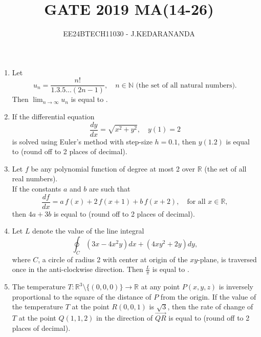 \documentclass[journal]{IEEEtran}
\renewcommand{\thefigure}{\theenumi}
\renewcommand{\thetable}{\theenumi}
\numberwithin{equation}{enumi}
\numberwithin{figure}{enumi}
\renewcommand{\thetable}{\theenumi}
\begin{document}

\vspace{3cm}

\title{GATE 2019 MA(14-26)}
\author{EE24BTECH11030 - J.KEDARANANDA}
{\let\newpage\relax\maketitle}
\renewcommand{\thefigure}{\theenumi}
\renewcommand{\thetable}{\theenumi}
\begin{enumerate}
\item  Let
\[
u_n = \frac{n!}{1.3.5...(2n-1)}, \quad n \in \mathbb{N} \text{ (the set of all natural numbers)}.
\]
Then $\lim_{n \to \infty} u_n$ is equal to \underline{\hspace{2cm}}.

\bigskip

\item  If the differential equation
\[
\frac{dy}{dx} = \sqrt{x^2 + y^2}, \quad y(1) = 2
\]
is solved using Euler's method with step-size $h = 0.1$, then $y(1.2)$ is equal to \underline{\hspace{2cm}} (round off to 2 places of decimal).

\bigskip

\item  Let $f$ be any polynomial function of degree at most 2 over $\mathbb{R}$ (the set of all real numbers).\\
If the constants $a$ and $b$ are such that
\[
\frac{df}{dx} = a \, f(x) + 2 \, f(x+1) + b \, f(x+2), \quad \text{for all } x \in \mathbb{R},
\]
then $4a + 3b$ is equal to \underline{\hspace{2cm}} (round off to 2 places of decimal).

\bigskip

\item  Let $L$ denote the value of the line integral
\[
\oint_C \left(3x - 4x^2y\right) dx + \left(4xy^2 + 2y\right) dy,
\]
where $C$, a circle of radius 2 with center at origin of the $xy$-plane, is traversed once in the anti-clockwise direction. Then $\frac{L}{\pi}$ is equal to \underline{\hspace{2cm}}.

\bigskip

\item  The temperature $T : \mathbb{R}^3 \setminus \{(0, 0, 0)\} \rightarrow \mathbb{R}$ at any point $P(x, y, z)$ is inversely proportional to the square of the distance of $P$ from the origin. If the value of the temperature $T$ at the point $R(0, 0, 1)$ is $\sqrt{3}$, then the rate of change of $T$ at the point $Q(1, 1, 2)$ in the direction of $\overrightarrow{QR}$ is equal to \underline{\hspace{2cm}} (round off to 2 places of decimal).


\end{enumerate}
\end{document}
